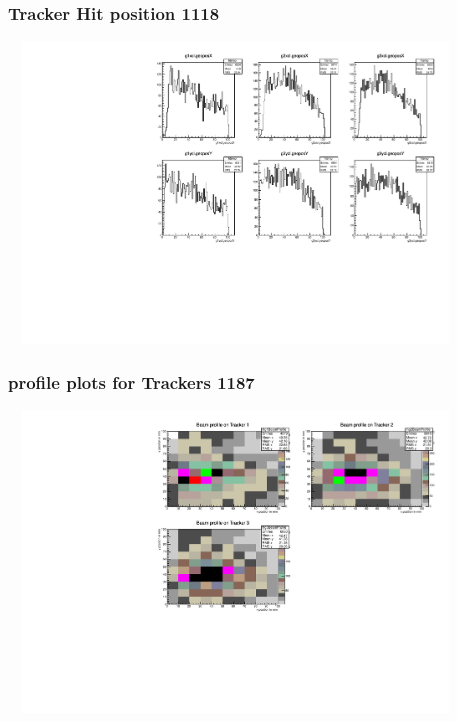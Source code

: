 \documentclass[slidestop,compress,mathserif]{beamer}
\begin{document}
\begin{frame}\frametitle{Tracker Hit position 1118}
	 \includegraphics[width=12cm,height=8cm]{Tracker_Hit_position_1118.pdf}
\end{frame}
\begin{frame}\frametitle{profile plots for Trackers 1187}
	 \includegraphics[width=12cm,height=8cm]{profile_plots_for_Trackers_1187.pdf}
\end{frame}
\end{document}
